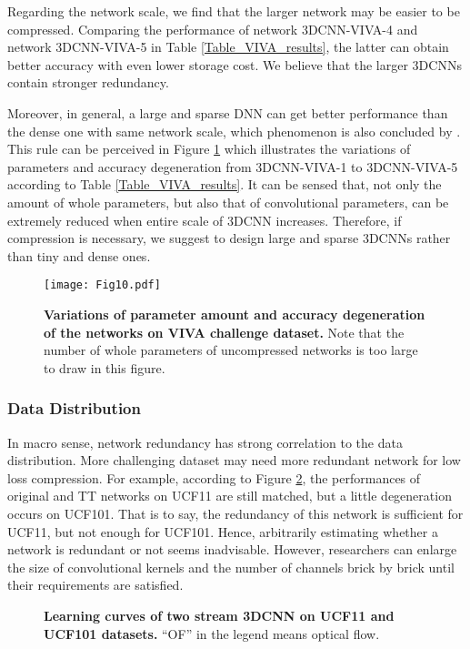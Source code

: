 \documentclass[a4paper,fleqn]{cas-dc}
\begin{document}
Regarding the network scale, we find that the larger network may be easier to be compressed. Comparing the performance of network 3DCNN-VIVA-4 and network 3DCNN-VIVA-5 in Table \ref{Table_VIVA_results}, the latter can obtain better accuracy with even lower storage cost. We believe that the larger 3DCNNs contain stronger redundancy.

Moreover, in general, a large and sparse DNN can get better performance than the dense one with same network scale, which phenomenon is also concluded by \citet{Zhu_2018_PruneOrNot}. This rule can be perceived in Figure \ref{Fig_scale} which illustrates the variations of parameters and accuracy degeneration from 3DCNN-VIVA-1 to 3DCNN-VIVA-5 according to Table \ref{Table_VIVA_results}. It can be sensed that, not only the amount of whole parameters, but also that of convolutional parameters, can be extremely reduced when entire scale of 3DCNN increases. Therefore, if compression is necessary, we suggest to design large and sparse 3DCNNs rather than tiny and dense ones.

\begin{figure}
\centering
\texttt{[image: Fig10.pdf]}
\caption{\textbf{Variations of parameter amount and accuracy degeneration of the networks on VIVA challenge dataset.} Note that the number of whole parameters of uncompressed networks is too large to draw in this figure.}
\label{Fig_scale}
\end{figure}

\subsubsection{Data Distribution}\quad

In macro sense, network redundancy has strong correlation to the data distribution. More challenging dataset may need more redundant network for low loss compression. For example, according to Figure \ref{Fig_learning_curve}, the performances of original and TT networks on UCF11 are still matched, but a little degeneration occurs on UCF101. That is to say, the redundancy of this network is sufficient for UCF11, but not enough for UCF101. Hence, arbitrarily estimating whether a network is redundant or not seems inadvisable. However, researchers can enlarge the size of convolutional kernels and the number of channels brick by brick until their requirements are satisfied.

\begin{figure}
\centering
{}
\caption{\textbf{Learning curves of two stream 3DCNN on UCF11 and UCF101 datasets.} ``OF'' in the legend means optical flow.}
\label{Fig_learning_curve}
\end{figure}
\end{document}
